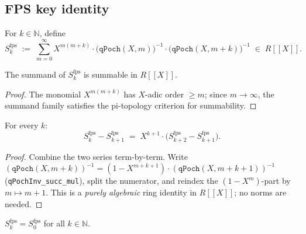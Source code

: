 \subsection{FPS key identity}
\label{subsec:fps-key}

\begin{definition}\label{def:fps-S}\leanok{}
For $k \in \mathbb{N}$, define
\[
  S^{\mathrm{fps}}_k
  \;:=\; \sum_{m=0}^{\infty}
    X^{m(m+k)} \cdot \bigl(\texttt{qPoch}(X,m)\bigr)^{-1}
    \cdot \bigl(\texttt{qPoch}(X,m+k)\bigr)^{-1}
  \;\in\; R[\![ X]\!].
\]
\end{definition}

\begin{lemma}\label{lem:fps-summable-S}\leanok{}
The summand of $S^{\mathrm{fps}}_k$ is summable in $R[\![ X]\!]$.
\end{lemma}

\begin{proof}\leanok
The monomial $X^{m(m+k)}$ has $X$-adic order $\ge m$; since $m \to \infty$, the
summand family satisfies the pi-topology criterion for summability.
\end{proof}

\begin{lemma}\label{lem:fps-S-recurrence}\leanok{}
For every $k$:
\[
  S^{\mathrm{fps}}_k - S^{\mathrm{fps}}_{k+1}
  \;=\; X^{k+1}\cdot\bigl(S^{\mathrm{fps}}_{k+2} - S^{\mathrm{fps}}_{k+1}\bigr).
\]
\end{lemma}

\begin{proof}\leanok
Combine the two series term-by-term. Write
$(\texttt{qPoch}(X, m+k))^{-1} = (1 - X^{m+k+1})\cdot (\texttt{qPoch}(X, m+k+1))^{-1}$
(\texttt{qPochInv\_succ\_mul}), split the numerator, and reindex
the $(1-X^m)$-part by $m \mapsto m+1$.
This is a \emph{purely algebraic} ring identity in $R[\![ X]\!]$;
no norms are needed.
\end{proof}

\begin{theorem}\label{thm:fps-S-const}\leanok{}
$S^{\mathrm{fps}}_k = S^{\mathrm{fps}}_0$ for all $k \in \mathbb{N}$.
\end{theorem}

